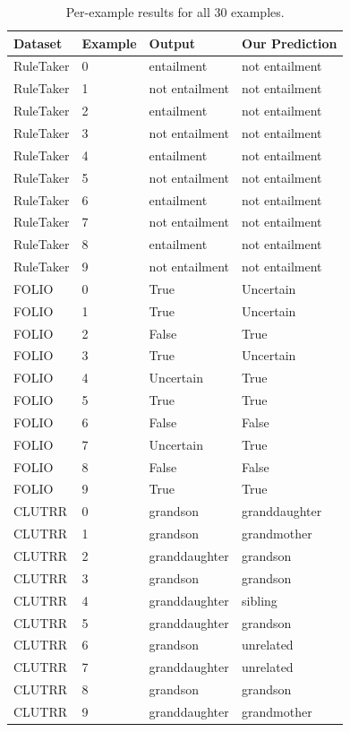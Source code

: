 \documentclass[11pt,letterpaper]{article}
\begin{document}
\begin{table}[!htbp]
\centering
\caption{Per-example results for all 30 examples.}
\label{tab:per_example}
\begin{tabular}{llll}
\toprule
Dataset & Example & Output & Our Prediction \\
\midrule
RuleTaker & 0 & entailment & not entailment \\
RuleTaker & 1 & not entailment & not entailment \\
RuleTaker & 2 & entailment & not entailment \\
RuleTaker & 3 & not entailment & not entailment \\
RuleTaker & 4 & entailment & not entailment \\
RuleTaker & 5 & not entailment & not entailment \\
RuleTaker & 6 & entailment & not entailment \\
RuleTaker & 7 & not entailment & not entailment \\
RuleTaker & 8 & entailment & not entailment \\
RuleTaker & 9 & not entailment & not entailment \\
\midrule
FOLIO & 0 & True & Uncertain \\
FOLIO & 1 & True & Uncertain \\
FOLIO & 2 & False & True \\
FOLIO & 3 & True & Uncertain \\
FOLIO & 4 & Uncertain & True \\
FOLIO & 5 & True & True \\
FOLIO & 6 & False & False \\
FOLIO & 7 & Uncertain & True \\
FOLIO & 8 & False & False \\
FOLIO & 9 & True & True \\
\midrule
CLUTRR & 0 & grandson & granddaughter \\
CLUTRR & 1 & grandson & grandmother \\
CLUTRR & 2 & granddaughter & grandson \\
CLUTRR & 3 & grandson & grandson \\
CLUTRR & 4 & granddaughter & sibling \\
CLUTRR & 5 & granddaughter & grandson \\
CLUTRR & 6 & grandson & unrelated \\
CLUTRR & 7 & granddaughter & unrelated \\
CLUTRR & 8 & grandson & grandson \\
CLUTRR & 9 & granddaughter & grandmother \\
\bottomrule
\end{tabular}
\end{table}
\end{document}
